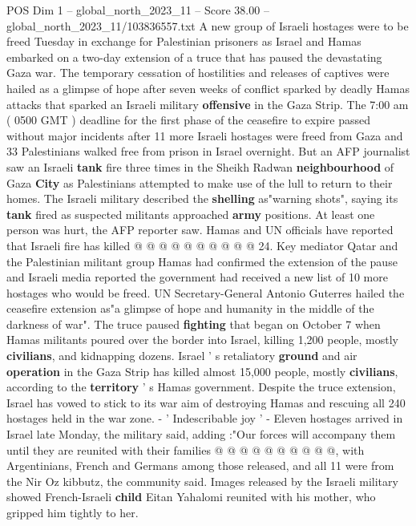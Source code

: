\begin{textsample}{POS Dim 1 – global\_north\_2023\_11 – Score 38.00 – global\_north\_2023\_11/103836557.txt}  \label{ex:f1_pos_258}
A new group of Israeli hostages were to be freed Tuesday in exchange for Palestinian prisoners as Israel and Hamas embarked on a two-day extension of a truce that has paused the devastating Gaza war.
The temporary cessation of hostilities and releases of captives were hailed as a glimpse of hope after seven weeks of conflict sparked by deadly Hamas attacks that sparked an Israeli military \textbf{offensive} in the Gaza Strip.
The 7:00 am ( 0500 GMT ) deadline for the first phase of the ceasefire to expire passed without major incidents after 11 more Israeli hostages were freed from Gaza and 33 Palestinians walked free from prison in Israel overnight.
But an AFP journalist saw an Israeli \textbf{tank} fire three times in the Sheikh Radwan \textbf{neighbourhood} of Gaza \textbf{City} as Palestinians attempted to make use of the lull to return to their homes.
The Israeli military described the \textbf{shelling} as"warning shots", saying its \textbf{tank} fired as suspected militants approached \textbf{army} positions.
At least one person was hurt, the AFP reporter saw.
Hamas and UN officials have reported that Israeli fire has killed @ @ @ @ @ @ @ @ @ @ 24.
Key mediator Qatar and the Palestinian militant group Hamas had confirmed the extension of the pause and Israeli media reported the government had received a new list of 10 more hostages who would be freed.
UN Secretary-General Antonio Guterres hailed the ceasefire extension as"a glimpse of hope and humanity in the middle of the darkness of war".
The truce paused \textbf{fighting} that began on October 7 when Hamas militants poured over the border into Israel, killing 1,200 people, mostly \textbf{civilians}, and kidnapping dozens.
Israel ' s retaliatory \textbf{ground} and air \textbf{operation} in the Gaza Strip has killed almost 15,000 people, mostly \textbf{civilians}, according to the \textbf{territory} ' s Hamas government.
Despite the truce extension, Israel has vowed to stick to its war aim of destroying Hamas and rescuing all 240 hostages held in the war zone. - ' Indescribable joy ' - Eleven hostages arrived in Israel late Monday, the military said, adding :"Our forces will accompany them until they are reunited with their families @ @ @ @ @ @ @ @ @ @, with Argentinians, French and Germans among those released, and all 11 were from the Nir Oz kibbutz, the community said.
Images released by the Israeli military showed French-Israeli \textbf{child} Eitan Yahalomi reunited with his mother, who gripped him tightly to her.

\end{textsample}
